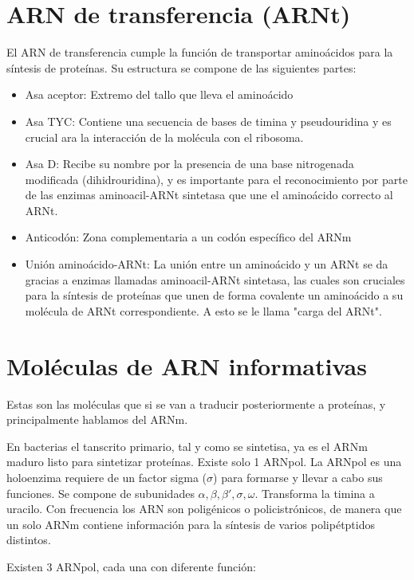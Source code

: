 \section{ARN de transferencia (ARNt)}

El ARN de transferencia cumple la función de transportar aminoácidos para la síntesis de proteínas. Su estructura se compone de las siguientes partes:

\begin{itemize}
    \item Asa aceptor: Extremo del tallo que lleva el aminoácido 
    \item Asa TYC: Contiene una secuencia de bases de timina y pseudouridina y es crucial ara la interacción de la molécula con el ribosoma.
    \item Asa D: Recibe su nombre por la presencia de una base nitrogenada modificada (dihidrouridina), y es importante para el reconocimiento por parte de las enzimas aminoacil-ARNt sintetasa que une el aminoácido correcto al ARNt.
    \item Anticodón: Zona complementaria a un codón específico del ARNm
    \item Unión aminoácido-ARNt: La unión entre un aminoácido y un ARNt se da gracias a enzimas llamadas aminoacil-ARNt sintetasa, las cuales son cruciales para la síntesis de proteínas que unen de forma covalente un aminoácido a su molécula de ARNt correspondiente. A esto se le llama "carga del ARNt".
\end{itemize}

\section{Moléculas de ARN informativas}

Estas son las moléculas que si se van a traducir posteriormente a proteínas, y principalmente hablamos del ARNm.

En bacterias el tanscrito primario, tal y como se sintetisa, ya es el ARNm maduro listo para sintetizar proteínas. Existe solo 1 ARNpol. La ARNpol es una holoenzima requiere de un factor sigma ($\sigma$) para formarse y llevar a cabo sus funciones. Se compone de subunidades $\alpha , \beta , \beta ' , \sigma , \omega$. Transforma la timina a uracilo. Con frecuencia los ARN son poligénicos o policistrónicos, de manera que un solo ARNm contiene información para la síntesis de varios polipétptidos distintos.

Existen 3 ARNpol, cada una con diferente función:

